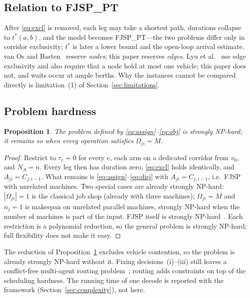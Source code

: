 \documentclass[manuscript,screen,review]{acmart}
\newtheorem{prop}{Proposition}
\begin{document}
\subsection{Relation to FJSP\_PT}
\label{sec:fjsppt}

After \eqref{eq:excl} is removed, each leg may take a shortest path, durations collapse to $t^{*}(a,b)$, and the model becomes FJSP\_PT---the two problems differ only in corridor exclusivity; $t^{*}$ is later a lower bound and the open-loop arrival estimate.
van Os and Basten~\cite{vanos2026exact} reserve \emph{nodes}; this paper reserves \emph{edges}.
Lyu et al.~\cite{lyu2019approach} use edge exclusivity and also require that a node hold at most one vehicle; this paper does not, and waits occur at ample berths.
Why the instances cannot be compared directly is limitation~(1) of Section~\ref{sec:limitations}.

\subsection{Problem hardness}

\begin{prop}
\label{prop:np_hard}
The problem defined by \eqref{eq:assign}--\eqref{eq:obj} is strongly NP-hard; it remains so when every operation satisfies
$\Omega_{ji}=M$.
\end{prop}

\begin{proof}
Restrict to $\tau_e=0$ for every $e$, each arm on a dedicated corridor from $v_0$, and $N_A=n$.
Every leg then has duration zero, \eqref{eq:excl} holds identically, and $A_{ji}=C_{j,i-1}$.
What remains is \eqref{eq:assign}--\eqref{eq:disj} with $A_{ji}=C_{j,i-1}$, i.e.\ FJSP with unrelated machines.
Two special cases are already strongly NP-hard: $|\Omega_{ji}|=1$ is the classical job shop (already with three machines); $\Omega_{ji}=M$ and $n_j=1$ is makespan on unrelated parallel machines, strongly NP-hard when the number of machines is part of the input.
FJSP itself is strongly NP-hard~\cite{dauzereperes2024fjsp}.
Each restriction is a polynomial reduction, so the general problem is strongly NP-hard; full flexibility does not make it easy.
\end{proof}

The reduction of Proposition~\ref{prop:np_hard} excludes vehicle contention, so the problem is already strongly NP-hard without it.
Fixing decisions~(i)--(iii) still leaves a conflict-free multi-agent routing problem~\cite{gao2023mapf}; routing adds constraints on top of the scheduling hardness.
The running time of one decode is reported with the framework (Section~\ref{sec:complexity}), not here.
\end{document}
